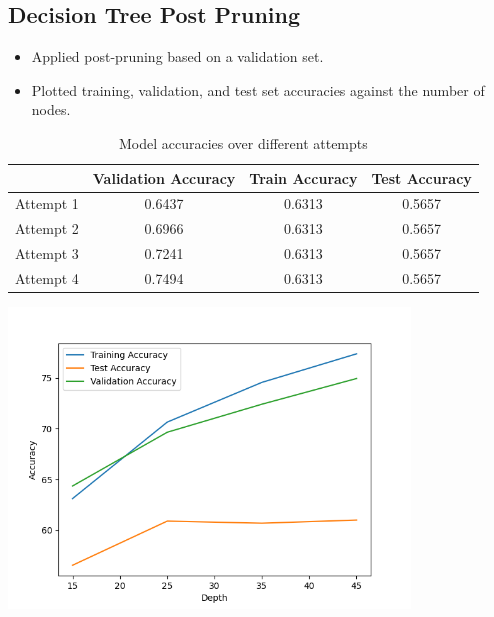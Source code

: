 \documentclass[12pt]{article}
\begin{document}
\subsection{Decision Tree Post Pruning}
    \begin{itemize}
        \item Applied post-pruning based on a validation set.
        \item Plotted training, validation, and test set accuracies against the number of nodes.
    \end{itemize}

    \begin{table}[ht]
\centering
\begin{tabular}{@{}lccc@{}}
\toprule
 & Validation Accuracy & Train Accuracy & Test Accuracy \\ 
\midrule
Attempt 1 & 0.6437 & 0.6313 & 0.5657 \\
Attempt 2 & 0.6966 & 0.6313 & 0.5657 \\
Attempt 3 & 0.7241 & 0.6313 & 0.5657 \\
Attempt 4 & 0.7494 & 0.6313 & 0.5657 \\
\bottomrule
\end{tabular}
\caption{Model accuracies over different attempts}
\label{tab:accuracies}
\end{table}

\begin{center}
    \includegraphics[width=0.8\textwidth]{Assignment 3/q1/(c)depth_vs_accuracy after pruning.png}
\end{center}
\end{document}
